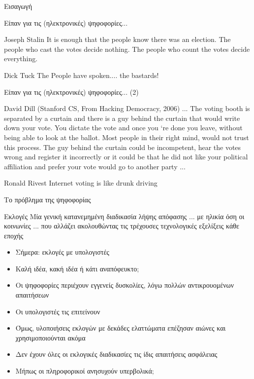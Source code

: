 \documentclass[handout]{beamer}
\begin{document}
\begin{section}{Εισαγωγή}

\begin{frame}{Είπαν για τις (ηλεκτρονικές) ψηφοφορίες...}

\begin{block}{Joseph Stalin}
It is enough that the people know there was an election. The people who cast the votes decide nothing. The people who count the votes decide everything.
\end{block}
\pause
\begin{block}{Dick Tuck}
The People have spoken.... the bastards!
\end{block}

\end{frame}

\begin{frame}{Είπαν για τις (ηλεκτρονικές) ψηφοφορίες... (2)}
\begin{block}{David Dill (Stanford CS, From Hacking Democracy, 2006)}
... The voting booth is separated by a curtain and there is a guy
behind the curtain that would write down your vote. You dictate the
vote and once you ‘re done you leave, without being able to look at 
the ballot. Most people in their right mind, would not trust this
process. The guy behind the curtain could be incompetent, hear the 
votes wrong and register it incorrectly or it could be that he did not
like your political affiliation and prefer your vote would go to
another party ...
\end{block}
\pause 
\begin{block}{Ronald Rivest}
Internet voting is like drunk driving
\end{block}

\end{frame}

\begin{frame}{Το πρόβλημα της ψηφοφορίας}
\begin{block}{Εκλογές}
   Μία γενική κατανεμημένη διαδικασία λήψης απόφασης ... με ηλικία όση οι κοινωνίες ... που αλλάζει ακολουθώντας τις τρέχουσες τεχνολογικές εξελίξεις κάθε εποχής
\end{block}
\pause
\begin{itemize}
    \item Σήμερα: εκλογές με υπολογιστές \pause
    \item Καλή ιδέα, κακή ιδέα ή κάτι αναπόφευκτο; \pause
    \item Οι ψηφοφορίες περιέχουν εγγενείς δυσκολίες, λόγω πολλών αντικρουομένων απαιτήσεων \pause
    \item Οι υπολογιστές τις επιτείνουν \pause
    \item Όμως, υλοποιήσεις εκλογών με δεκάδες ελαττώματα επέζησαν αιώνες και χρησιμοποιούνται ακόμα \pause
    \item Δεν έχουν όλες οι εκλογικές διαδικασίες τις ίδις απαιτήσεις ασφάλειας
    \item Μήπως οι πληροφορικοί ανησυχούν υπερβολικά;
\end{itemize}
\end{frame}
\end{section}
\end{document}
